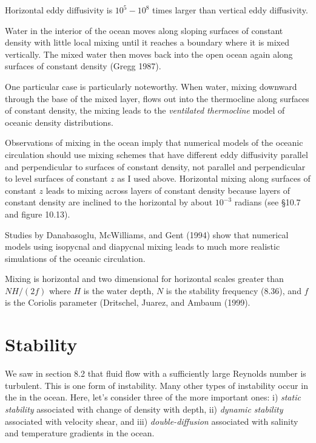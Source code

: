 \begin{enumerate}
\vitem Horizontal eddy diffusivity is $10^5 - 10^8$ times larger than
vertical eddy diffusivity.

\vitem {}Water in the interior of the ocean
moves along sloping surfaces of constant density with little local
mixing until it reaches a boundary where it is mixed vertically. The
mixed water then moves back into the open ocean again along surfaces
of constant density (Gregg 1987).

One particular case is particularly noteworthy. When water, mixing
downward through the base of the mixed layer, flows out into the thermocline along surfaces of
constant density, the mixing leads to the \textit{ventilated
  thermocline} model of oceanic
density distributions.

\vitem Observations of mixing in the ocean imply that numerical models
of the oceanic circulation should use mixing schemes that have
different eddy diffusivity parallel and perpendicular to surfaces of
constant density, not parallel and perpendicular to level
surfaces of constant $z$ as I used
above. Horizontal mixing along surfaces of constant $z$ leads to
mixing across layers of constant density because layers of constant
density are inclined to the horizontal by about $10^{-3}$ radians (see
\S10.7 and figure 10.13).

Studies by Danabasoglu, McWilliams, and Gent (1994) show that
numerical models using isopycnal and diapycnal
mixing leads to much
more realistic simulations of the oceanic circulation.

\vitem Mixing is horizontal and two dimensional for horizontal scales
greater than $NH/(2f)$ where $H$ is the water depth, $N$ is the
stability frequency (8.36), and $f$ is the
Coriolis parameter (Dritschel, Juarez, and Ambaum (1999).
\end{enumerate}
\vspace{-2ex}

\section{Stability}
We saw in section 8.2 that fluid flow with a sufficiently large
Reynolds number is turbulent. This is one form of instability. Many
other types of instability occur in the in the ocean. Here, let's
consider three of the more important ones: i) \textit{static
  stability} associated with change of
density with depth, ii) \textit{dynamic
  stability} associated with velocity
shear, and iii) \textit{double-diffusion}
associated with salinity and temperature gradients in the ocean.

